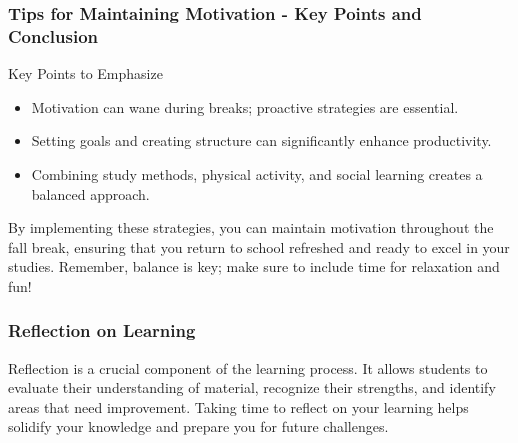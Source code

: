 \documentclass[aspectratio=169]{beamer}
\begin{document}
\begin{frame}[fragile]
    \frametitle{Tips for Maintaining Motivation - Key Points and Conclusion}
    \begin{block}{Key Points to Emphasize}
        \begin{itemize}
            \item Motivation can wane during breaks; proactive strategies are essential.
            \item Setting goals and creating structure can significantly enhance productivity.
            \item Combining study methods, physical activity, and social learning creates a balanced approach.
        \end{itemize}
    \end{block}

    By implementing these strategies, you can maintain motivation throughout the fall break, ensuring that you return to school refreshed and ready to excel in your studies. 
    Remember, balance is key; make sure to include time for relaxation and fun!
\end{frame}

\begin{frame}[fragile]
    \frametitle{Reflection on Learning}
    
    Reflection is a crucial component of the learning process. 
    It allows students to evaluate their understanding of material, recognize their strengths, and identify areas that need improvement.
    Taking time to reflect on your learning helps solidify your knowledge and prepare you for future challenges.
\end{frame}
\end{document}

